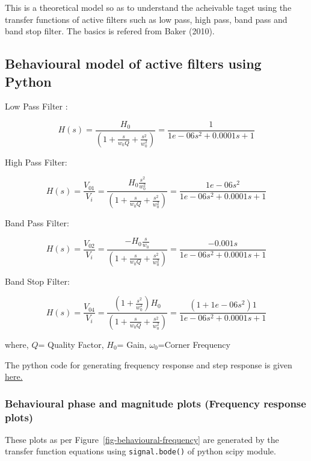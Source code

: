\documentclass[
  letterpaper,
  DIV=11,
  numbers=noendperiod]{scrreprt}
\begin{document}
This is a theoretical model so as to understand the acheivable taget
using the transfer functions of active filters such as low pass, high
pass, band pass and band stop filter. The basics is refered from Baker
(2010).

\subsection{Behavioural model of active filters using
Python}\label{behavioural-model-of-active-filters-using-python}

Low Pass Filter :

\[
H(s) = \frac{H_0}{(1+\frac{s}{w_0 Q}+\frac{s^2}{w_0^2})} = \frac{1}{1e-06s^2 + 0.0001s + 1}
\]

High Pass Filter:

\[H(s) = \frac{V_{01}}{V_i} = \frac{H_0\frac{s^2}{w_0^2}}{(1+\frac{s}{w_0 Q}+\frac{s^2}{w_0^2})} = \frac{1e-06 s^2}{1e-06s^2 + 0.0001s + 1}\]

Band Pass Filter:

\[H(s) = \frac{V_{02}}{V_i} = \frac{-H_0\frac{s}{w_0}}{(1+\frac{s}{w_0 Q}+\frac{s^2}{w_0^2})} = \frac{-0.001 s}{1e-06s^2 + 0.0001s + 1}\]

Band Stop Filter:

\[H(s) = \frac{V_{04}}{V_i} = \frac{(1 + \frac{s^2}{w_0^2})H_0}{(1+\frac{s}{w_0 Q}+\frac{s^2}{w_0^2})} = \frac{( 1 + 1e-06 s^2 ) 1}{1e-06s^2 + 0.0001s + 1}\]

where, \(Q\)= Quality Factor, \(H_0\)= Gain, \(\omega_0\)=Corner
Frequency

The python code for generating frequency response and step response is
given
\href{https://github.com/oreymaonr/hsb-amcd-sose2025-5/blob/main/content/plotfn.py}{here.}

\subsubsection{Behavioural phase and magnitude plots (Frequency response
plots)}\label{behavioural-phase-and-magnitude-plots-frequency-response-plots}

These plots as per Figure~\ref{fig-behavioural-frequency} are generated
by the transfer function equations using \texttt{signal.bode()} of
python scipy module.
\end{document}
